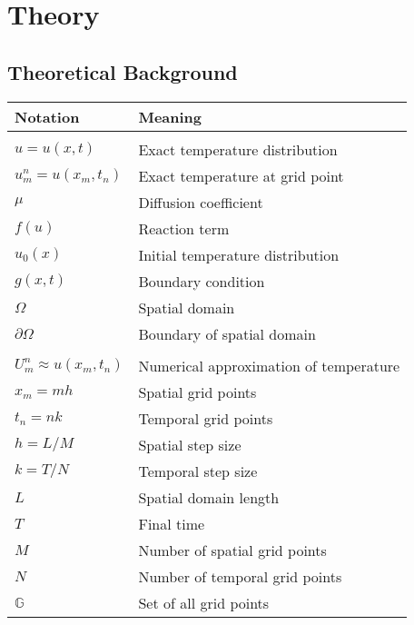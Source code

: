 \section{Theory}

\subsection{Theoretical Background}
\begin{tabular}{ll}
  \textbf{Notation}               & \textbf{Meaning}                       \\
  \hline                                                                 \\[-1em]
  \(u = u(x, t)\)               & Exact temperature distribution         \\
  \(u_m^n = u(x_m, t_n)\)       & Exact temperature at grid point        \\
  \(\mu\)                       & Diffusion coefficient                  \\
  \(f(u)\)                      & Reaction term                          \\
  \(u_0(x)\)                    & Initial temperature distribution       \\
  \(g(x, t)\)                   & Boundary condition                     \\
  \(\Omega\)                    & Spatial domain                         \\
  \(\partial \Omega\)           & Boundary of spatial domain             \\
  \hline                                                                 \\[-1em]
  \(U_m^n \approx u(x_m, t_n)\) & Numerical approximation of temperature \\
  \(x_m = m h\)                 & Spatial grid points                    \\
  \(t_n = n k\)                 & Temporal grid points                   \\
  \(h = L/M\)                   & Spatial step size                      \\
  \(k =T/N\)                    & Temporal step size                     \\
  \(L\)                         & Spatial domain length                  \\
  \(T\)                         & Final time                             \\
  \(M\)                         & Number of spatial grid points          \\
  \(N\)                         & Number of temporal grid points         \\
  \(\mathbb{G}\)                & Set of all grid points                 \\
  \hline
\end{tabular}

